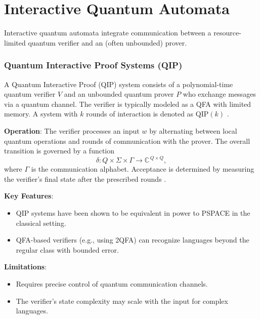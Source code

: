 
\section{Interactive Quantum Automata}
\label{sec:interactive-quantum}

Interactive quantum automata integrate communication between a resource-limited quantum verifier and an (often unbounded) prover.

\subsubsection{Quantum Interactive Proof Systems (QIP)}
\label{sssec:qip}
\begin{definition}
A Quantum Interactive Proof (QIP) system consists of a polynomial-time quantum verifier \( V \) and an unbounded quantum prover \( P \) who exchange messages via a quantum channel. The verifier is typically modeled as a QFA with limited memory. A system with \( k \) rounds of interaction is denoted as \(\text{QIP}(k)\) \cite{nishimura2009application, zheng2015power}.
\end{definition}

\textbf{Operation}: The verifier processes an input \( w \) by alternating between local quantum operations and rounds of communication with the prover. The overall transition is governed by a function
\[
\delta: Q \times \Sigma \times \Gamma \to \mathbb{C}^{\, Q \times Q},
\]
where \( \Gamma \) is the communication alphabet. Acceptance is determined by measuring the verifier’s final state after the prescribed rounds \cite{zheng2015power}.

\textbf{Key Features}:
\begin{itemize}
    \item QIP systems have been shown to be equivalent in power to PSPACE in the classical setting.
    \item QFA-based verifiers (e.g., using 2QFA) can recognize languages beyond the regular class with bounded error.
\end{itemize}

\textbf{Limitations}:
\begin{itemize}
    \item Requires precise control of quantum communication channels.
    \item The verifier’s state complexity may scale with the input for complex languages.
\end{itemize}

